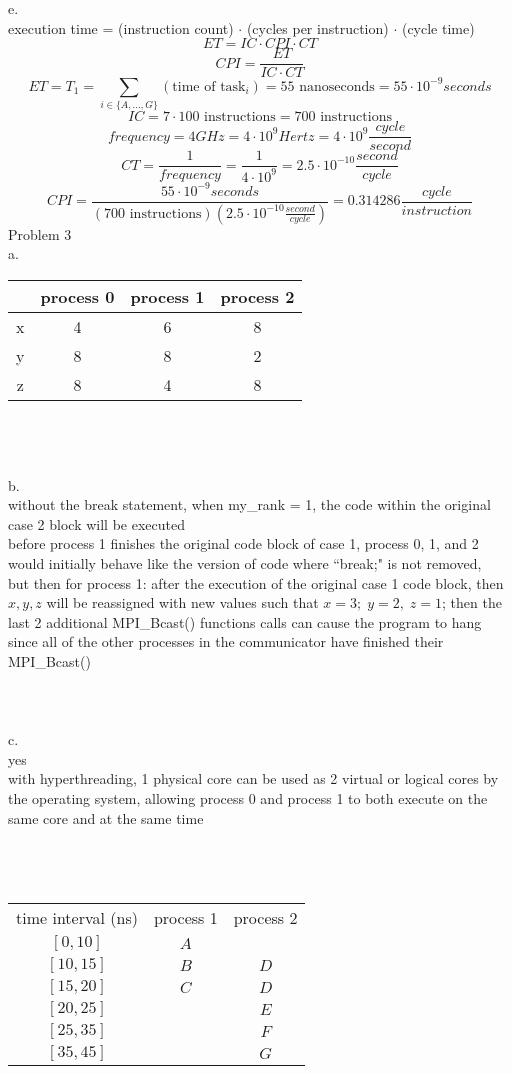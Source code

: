 \documentclass[12pt,border=4pt,multi]{article}%
\begin{document}
e.\\
execution time = (instruction count) $\cdot$ (cycles per instruction) $\cdot$ (cycle time)\\
\[ET = IC \cdot CPI \cdot CT\]
\[CPI = \frac{ET}{IC \cdot CT}\]
\[ET = T_1 = \sum_{i \in \{A, ..., G\}} (\text{time of task}_i) = 55\text{ nanoseconds} = 55 \cdot 10^{-9} seconds\]
\[IC = 7 \cdot 100 \text{ instructions} = 700 \text{ instructions}\]
\[frequency = 4 GHz = 4 \cdot 10^9 Hertz = 4 \cdot 10^9 \frac{cycle}{second}\]
\[CT = \frac{1}{frequency} = \frac{1}{4 \cdot 10^9} = 2.5 \cdot 10^{-10} \frac{second}{cycle}\]
\[CPI = \frac{55 \cdot 10^{-9} seconds}{(700 \text{ instructions})(2.5 \cdot 10^{-10} \frac{second}{cycle})} = 0.314286 \frac{cycle}{instruction}\]
\newpage
\noindent
Problem 3\\
a.\\
{\large
\begin{center}
\begin{tabular}{|c|c|c|c|}
\hline
& process 0 & process 1 & process 2\\
\hline
x & 4 & 6 & 8\\
\hline
y & 8 & 8 & 2\\
\hline
z & 8 & 4 & 8\\
\hline
\end{tabular}
\end{center}
}
\leavevmode
\\
\\
\\
b.\\
without the break statement, when my\_rank = 1, the code within the original case 2 block will be executed\\
before process 1 finishes the original code block of case 1, process 0, 1, and 2 would initially behave like the version of code where ``break;" is not removed,\\
but then for process 1: after the execution of the original case 1 code block, then $x, y, z$ will be reassigned with new values such that $x = 3;\; y = 2,\; z = 1$; then the last 2 additional MPI\_Bcast() functions calls can cause the program to hang since all of the other processes in the communicator have finished their MPI\_Bcast()\\
\\
\\
\\
c.\\
yes\\
with hyperthreading, 1 physical core can be used as 2 virtual or logical cores by the operating system, allowing process 0 and process 1 to both execute on the same core and at the same time\\
\\
\\
\\
\begin{center}
\begin{tabular}{ccc}
 time interval (ns) & process 1 & process 2\\
 $[0, 10]$ & $A$ & \\
 $[10, 15]$ & $B$ & $D$\\
 $[15, 20]$ & $C$ & $D$\\
 $[20, 25]$ & & $E$\\
 $[25, 35]$ & & $F$\\
 $[35, 45]$ & & $G$\\
\end{tabular}
\end{center}
\end{document}
